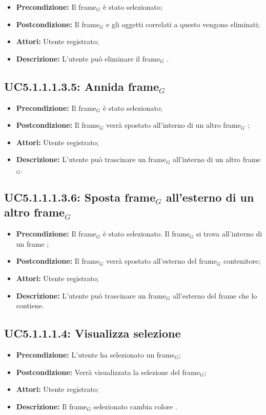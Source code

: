\begin{itemize}
	\item \textbf{Precondizione:} Il frame$_G$ è stato selezionato;
	\item \textbf{Postcondizione:} Il frame$_G$ e gli oggetti correlati a questo vengono eliminati;
	\item \textbf{Attori:} Utente registrato;
	\item \textbf{Descrizione:} L'utente può eliminare il frame$_G$ .
\end{itemize}
\subsection{ UC5.1.1.1.3.5: Annida frame$_G$}

\begin{itemize}
	\item \textbf{Precondizione:} Il frame$_G$ è stato selezionato;
	\item \textbf{Postcondizione:} Il frame$_G$ verrà spostato all'interno di un altro frame$_G$  ;
	\item \textbf{Attori:} Utente registrato;
	\item \textbf{Descrizione:} L'utente può trascinare un frame$_G$ all'interno di un altro frame$_G$.
\end{itemize}
\subsection{ UC5.1.1.1.3.6: Sposta frame$_G$ all'esterno di un altro frame$_G$  }

\begin{itemize}
	\item \textbf{Precondizione:} Il frame$_G$ è stato selezionato. Il frame$_G$ si trova all'interno di un frame ;
	\item \textbf{Postcondizione:} Il frame$_G$ verrà spostato all'esterno del frame$_G$ contenitore;
	\item \textbf{Attori:} Utente registrato;
	\item \textbf{Descrizione:} L'utente può trascinare un frame$_G$ all'esterno del frame che lo contiene.
\end{itemize}
\subsection{ UC5.1.1.1.4: Visualizza selezione}

\begin{itemize}
	\item \textbf{Precondizione:} L'utente ha selezionato un frame$_G$;
	\item \textbf{Postcondizione:} Verrà visualizzata la selezione del frame$_G$;
	\item \textbf{Attori:} Utente registrato;
	\item \textbf{Descrizione:} Il frame$_G$ selezionato cambia colore .
\end{itemize}

